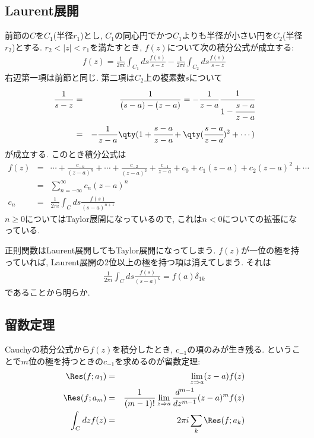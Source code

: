 \documentclass[10.5pt,a4paper]{jreport}
\begin{document}
\subsection{Laurent展開}
前節の$C$を$C_1$(半径$r_1$)とし, $C_1$の同心円でかつ$C_1$よりも半径が小さい円を$C_2$(半径$r_2$)とする. $r_2 < |z| < r_1$を満たすとき, $f(z)$について次の積分公式が成立する:
\begin{eqnarray}
  f(z) = \frac{1}{2\pi i}\int_{C_1} ds \frac{f(s)}{s-z} - \frac{1}{2\pi i}\int_{C_2} ds \frac{f(s)}{s-z}
\end{eqnarray}
右辺第一項は前節と同じ. 第二項は$C_2$上の複素数$s$について
\begin{eqnarray}
  \frac{1}{s-z} &=& \frac{1}{(s - a) - (z - a)} = -\frac{1}{z - a}\cfrac{1}{1 -\cfrac{s - a}{z - a}}\\
  &=& -\frac{1}{z - a}\qty(1 + \cfrac{s - a}{z - a} + \qty(\cfrac{s - a}{z - a})^2 + \cdots)
\end{eqnarray}
が成立する. このとき積分公式は
\begin{eqnarray}
  \nonumber f(z) &=& \cdots + \frac{c_{-n}}{(z - a)^n} + \cdots + \frac{c_{-2}}{(z - a)^2} + \frac{c_{-1}}{z - a} + c_0 + c_{1}(z - a) + c_{2}(z - a)^2 + \cdots\\
  &=& \sum_{n = -\infty}^{\infty} c_n(z-a)^n\\
  c_n &=& \frac{1}{2\pi i}\int_C ds \frac{f(s)}{(s-a)^{n+1}}
\end{eqnarray}
$n\geq0$についてはTaylor展開になっているので, これは$n<0$についての拡張になっている.

正則関数はLaurent展開してもTaylor展開になってしまう. $f(z)$が一位の極を持っていれば, Laurent展開の2位以上の極を持つ項は消えてしまう. それは
\begin{eqnarray}
  \frac{1}{2\pi i}\int_C ds \frac{f(s)}{(s-a)^k} = f(a)\delta_{1k}
\end{eqnarray}
であることから明らか.
\subsection{留数定理}
Cauchyの積分公式から$f(z)$を積分したとき, $c_{-1}$の項のみが生き残る. ということで$m$位の極を持つときの$c_{-1}$を求めるのが留数定理:
\begin{eqnarray}
  \Res(f; a_1) &=& \lim_{z\Rightarrow a}(z - a)f(z)\\
  \Res(f; a_m) &=& \frac{1}{(m-1)!}\lim_{z\Rightarrow a}\frac{d^{m-1}}{dz^{m-1}}(z - a)^mf(z)\\
  \int_C dz f(z) &=& 2\pi i\sum_k \Res(f; a_k)
\end{eqnarray}
\end{document}
